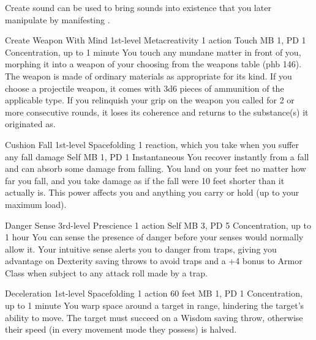   Create sound can be used to bring sounds into existence that you later
  manipulate by manifesting .

\DndPowerHeader%
  {Create Weapon With Mind}
  {1st-level Metacreativity}
  {1 action}
  {Touch}
  {MB 1, PD 1}
  {Concentration, up to 1 minute}
  You touch any mundane matter in front of you,
  morphing it into a weapon of your choosing
  from the weapons table (phb 146).
  The weapon is made of ordinary materials
  as appropriate for its kind.
  If you choose a projectile weapon,
  it comes with 3d6 pieces of ammunition
  of the applicable type.
  If you relinquish your grip on the weapon you called
  for 2 or more consecutive rounds,
  it loses its coherence and returns to the substance(s)
  it originated as.

\DndPowerHeader%
  {Cushion Fall}
  {1st-level Spacefolding}
  {1 reaction, which you take when you suffer any fall damage}
  {Self}
  {MB 1, PD 1}
  {Instantaneous}
  You recover instantly from a fall
  and can absorb some damage from falling.
  You land on your feet no matter how far you fall,
  and you take damage as if the fall were
  10 feet shorter than it actually is.
  This power affects you and anything you carry or hold
  (up to your maximum load).

\DndPowerHeader%
  {Danger Sense}
  {3rd-level Prescience}
  {1 action}
  {Self}
  {MB 3, PD 5}
  {Concentration, up to 1 hour}
  You can sense the presence of danger
  before your senses would normally allow it.
  Your intuitive sense alerts you to danger from traps,
  giving you advantage on Dexterity saving throws to avoid traps
  and a +4 bonus to Armor Class when subject to any attack roll
  made by a trap.

\DndPowerHeader%
  {Deceleration}
  {1st-level Spacefolding}
  {1 action}
  {60 feet}
  {MB 1, PD 1}
  {Concentration, up to 1 minute}
You warp space around a target in range,
hindering the target's ability to move.
The target must succeed on a Wisdom saving throw,
otherwise their speed (in every movement mode they possess) is halved.

